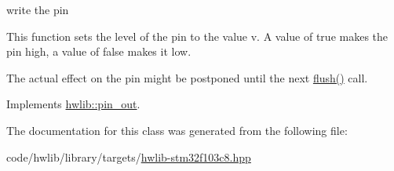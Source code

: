 write the pin

This function sets the level of the pin to the value v. A value of true makes the pin high, a value of false makes it low.

The actual effect on the pin might be postponed until the next \hyperlink{classstm32f103c8_1_1pin__out_a401a547302edb7ceb655e5d4be0af6a8}{flush()} call. 

Implements \hyperlink{classhwlib_1_1pin__out_a8d260a70e503dcfb81987c408e170300}{hwlib\+::pin\+\_\+out}.



The documentation for this class was generated from the following file\+:\begin{DoxyCompactItemize}
\item 
code/hwlib/library/targets/\hyperlink{hwlib-stm32f103c8_8hpp}{hwlib-\/stm32f103c8.\+hpp}\end{DoxyCompactItemize}
